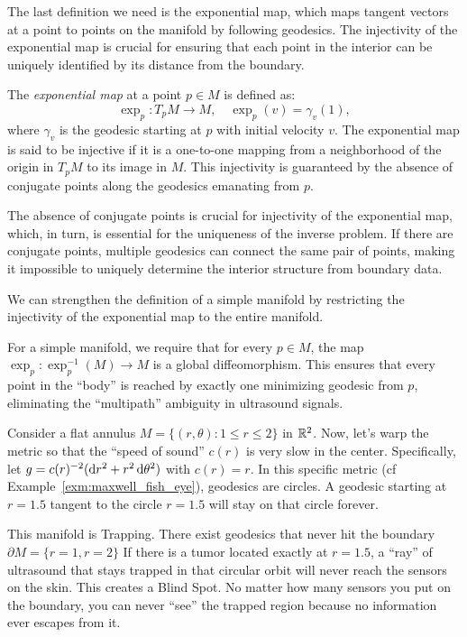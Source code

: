 The last definition we need is the exponential map, which maps tangent vectors at a point to points on the manifold by following geodesics. The injectivity of the exponential map is crucial for ensuring that each point in the interior can be uniquely identified by its distance from the boundary.

\begin{definition}
  The \emph{exponential map} at a point $p \in M$ is defined as:
  \[%
    \exp_p : T_pM \to M, \quad \exp_p(v) = \gamma_v(1)
  ,\]%
  where $\gamma_v$ is the geodesic starting at $p$ with initial velocity $v$. The exponential map is said to be injective if it is a one-to-one mapping from a neighborhood of the origin in $T_pM$ to its image in $M$. This injectivity is guaranteed by the absence of conjugate points along the geodesics emanating from $p$.
\end{definition}

The absence of conjugate points is crucial for injectivity of the exponential map, which, in turn, is essential for the uniqueness of the inverse problem. If there are conjugate points, multiple geodesics can connect the same pair of points, making it impossible to uniquely determine the interior structure from boundary data.

We can strengthen the definition of a simple manifold by restricting the injectivity of the exponential map to the entire manifold.

For a simple manifold, we require that for every $p \in M$, the map $\exp_p : \exp_p^{-1}(M) \to M$ is a global diffeomorphism. This ensures that every point in the ``body'' is reached by exactly one minimizing geodesic from $p$, eliminating the ``multipath'' ambiguity in ultrasound signals.

\begin{example}
  Consider a flat annulus $M = \{(r, \theta) : 1 \leq r \leq 2\}$ in $\mathbb{R}^2$. Now, let's warp the metric so that the ``speed of sound'' $c(r)$ is very slow in the center. Specifically, let $g = c(r)^{-2}(\dr^2 + r^2 \dd{\theta}^2)$ with $c(r) = r$. In this specific metric (cf Example~\ref{exm:maxwell_fish_eye}), geodesics are circles. A geodesic starting at $r = 1.5$ tangent to the circle $r = 1.5$ will stay on that circle forever.

  This manifold is Trapping. There exist geodesics that never hit the boundary $\partial M = \{r = 1, r = 2\}$ If there is a tumor located exactly at $r = 1.5$, a ``ray'' of ultrasound that stays trapped in that circular orbit will never reach the sensors on the skin. This creates a Blind Spot. No matter how many sensors you put on the boundary, you can never ``see'' the trapped region because no information ever escapes from it.
\end{example}

